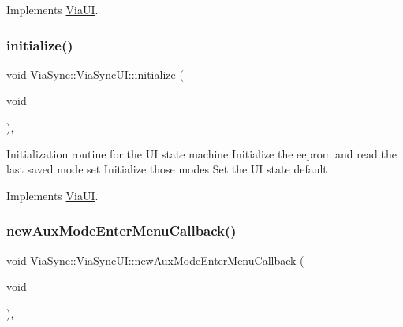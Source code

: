 Implements \mbox{\hyperlink{class_via_u_i_a226eb7b65b6035a611dd734d965fa7c2}{Via\+UI}}.

\mbox{\label{class_via_sync_1_1_via_sync_u_i_a0d9dbe5a0b663acc88b45b46f440db78}} 
\subsubsection{\texorpdfstring{initialize()}{initialize()}}
{\footnotesize\ttfamily void Via\+Sync\+::\+Via\+Sync\+U\+I\+::initialize (\begin{DoxyParamCaption}\item[{void}]{ }\end{DoxyParamCaption})\hspace{0.3cm}{\ttfamily [override]}, {\ttfamily [virtual]}}

Initialization routine for the UI state machine Initialize the eeprom and read the last saved mode set Initialize those modes Set the UI state default 

Implements \mbox{\hyperlink{class_via_u_i_a573ba7aef8f4982ec4900258c770bdbb}{Via\+UI}}.

\mbox{\label{class_via_sync_1_1_via_sync_u_i_a842b231f8014209b4e96b3b8c06b16e1}} 
\subsubsection{\texorpdfstring{new\+Aux\+Mode\+Enter\+Menu\+Callback()}{newAuxModeEnterMenuCallback()}}
{\footnotesize\ttfamily void Via\+Sync\+::\+Via\+Sync\+U\+I\+::new\+Aux\+Mode\+Enter\+Menu\+Callback (\begin{DoxyParamCaption}\item[{void}]{ }\end{DoxyParamCaption})\hspace{0.3cm}{\ttfamily [override]}, {\ttfamily [virtual]}}



